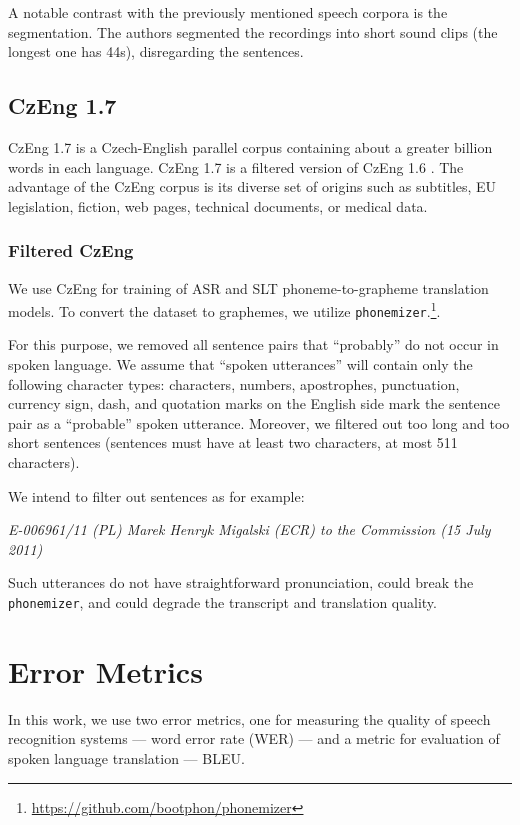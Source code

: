 A notable contrast with the previously mentioned speech corpora is the segmentation. The authors segmented the recordings into short sound clips (the longest one has 44s), disregarding the sentences.

\subsection{CzEng 1.7}
CzEng 1.7 is a Czech-English parallel corpus containing about a greater billion words in each language. CzEng 1.7 is a filtered version of CzEng 1.6 . The advantage of the CzEng corpus is its diverse set of origins such as subtitles, EU legislation, fiction, web pages, technical documents, or medical data. 

\subsubsection{Filtered CzEng}
\label{filtered_czeng}
We use CzEng for training of ASR and SLT phoneme-to-grapheme translation models. To convert the dataset to graphemes, we utilize \texttt{phone\-mi\-zer}.\footnote{\url{https://github.com/bootphon/phonemizer}}.

For this purpose, we removed all sentence pairs that ``probably'' do not occur in spoken language. We assume that ``spoken utterances'' will contain only the following character types: characters, numbers, apostrophes, punctuation, currency sign, dash, and quotation marks on the English side mark the sentence pair as a ``probable'' spoken utterance. Moreover, we filtered out too long and too short sentences (sentences must have at least two characters, at most 511 characters).

We intend to filter out sentences as for example: \\

\begin{minipage}{0.95\linewidth}
	\small\emph{E-006961/11 (PL) Marek Henryk Migalski (ECR) to the Commission (15 July 2011)}\\
\end{minipage}


Such utterances do not have straightforward pronunciation, could break the \texttt{phone\-mi\-zer}, and could degrade the transcript and translation quality.



\pagebreak
\section{Error Metrics}
In this work, we use two error metrics, one for measuring the quality of speech recognition systems --- word error rate (WER) --- and a metric for evaluation of spoken language translation --- BLEU.

